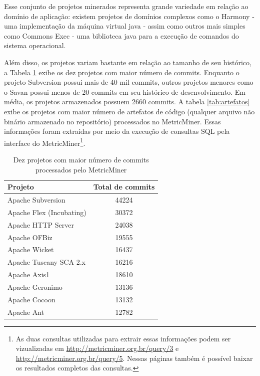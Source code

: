 \documentclass[a4paper, 12pt, twoside]{book}
\begin{document}
        Esse conjunto de projetos minerados representa grande variedade em relação ao domínio de aplicação: existem projetos de domínios complexos como o Harmony - uma implementação da máquina virtual java - assim como outros mais simples como Commons Exec - uma biblioteca java para a execução de comandos do sistema operacional. 

        Além disso, os projetos variam bastante em relação ao tamanho de seu histórico, a Tabela \ref{tab:commits} exibe os dez projetos com maior número de commits. Enquanto o projeto Subversion possui mais de 40 mil commits, outros projetos menores como o Savan possui menos de 20 commits em seu histórico de desenvolvimento. Em média, os projetos armazenados possuem 2660 commits. A tabela \ref{tab:artefatos} exibe os projetos com maior número de artefatos de código (qualquer arquivo não binário armazenado no repositório) processados no MetricMiner. Essas informações foram extraídas por meio da execução de consultas SQL pela interface do MetricMiner\footnote{As duas consultas utilizadas para extrair essas informações podem ser vizualizadas em \url{http://metricminer.org.br/query/3} e \url{http://metricminer.org.br/query/5}. Nessas páginas também é possível baixar os resultados completos das consultas.}.

        \begin{table}\begin{center}
        \begin{tabular}{| p{6cm} | c |}
            \hline                        
            \textbf{Projeto} & \textbf{Total de commits} \\
            \hline                        
            Apache Subversion & 44224 \\
            \hline
            Apache Flex (Incubating) & 30372 \\
            \hline
            Apache HTTP Server & 24038 \\
            \hline
            Apache OFBiz & 19555 \\
            \hline
            Apache Wicket & 16437 \\
            \hline
            Apache Tuscany SCA 2.x & 16216 \\
            \hline
            Apache Axis1 & 18610 \\
            \hline
            Apache Geronimo & 13136 \\
            \hline
            Apache Cocoon & 13132 \\
            \hline
            Apache Ant & 12782 \\
            \hline
        \end{tabular}
        \caption{Dez projetos com maior número de commits processados pelo MetricMiner \label{tab:commits}}
        \end{center}\end{table}
\end{document}
